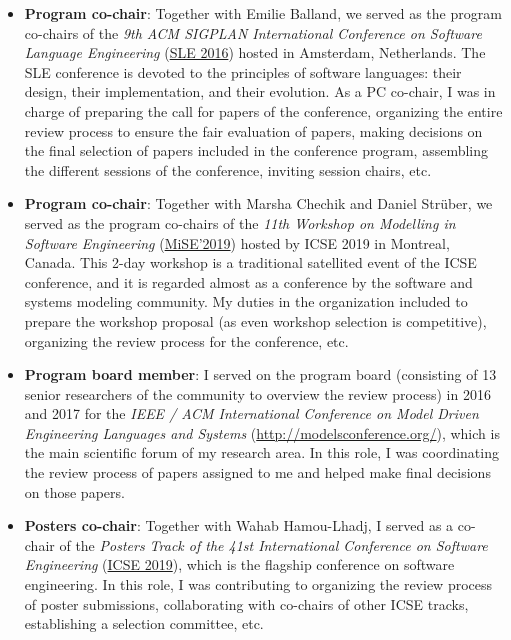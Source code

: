 \begin{itemize}
\item \textbf{Program co-chair}: Together with Emilie Balland, we served as the program co-chairs of the \emph{9th ACM SIGPLAN International Conference on Software Language Engineering} (\href{https://www.sleconf.org/2016/}{SLE 2016}) hosted in Amsterdam, Netherlands. The SLE conference is devoted to the principles of software languages: their design, their implementation, and their evolution. As a PC co-chair, I was in charge of preparing the call for papers of the conference, organizing the entire review process to ensure the fair evaluation of papers, making decisions on the final selection of papers included in the conference program, assembling the different sessions of the conference, inviting session chairs, etc. 

\item \textbf{Program co-chair}: Together with Marsha Chechik and Daniel Strüber, we served as the program co-chairs of the \emph{11th Workshop on Modelling in Software Engineering} (\href{https://sselab.de/lab2/public/wiki/MiSE/index.php}{MiSE’2019}) hosted by ICSE 2019 in Montreal, Canada. This 2-day workshop is a traditional satellited event of the ICSE conference, and it is regarded almost as a conference by the software and systems modeling community. My duties in the organization included to prepare the workshop proposal (as even workshop selection is competitive), organizing the review process for the conference, etc.

\item \textbf{Program board member}: I served on the program board (consisting of 13 senior researchers of the community to overview the review process) in 2016 and 2017 for the \emph{IEEE / ACM International Conference on Model Driven Engineering Languages and Systems} (\href{MODELS}{http://modelsconference.org/}), which is the main scientific forum of my research area. In this role, I was coordinating the review process of papers assigned to me and helped make final decisions on those papers.

\item \textbf{Posters co-chair}: Together with Wahab Hamou-Lhadj, I served as a co-chair of the \emph{Posters Track of the 41st International Conference on Software Engineering} 
(\href{https://2019.icse-conferences.org/track/icse-2019-Posters}{ICSE 2019}), which is the flagship conference on software engineering. In this role, I was contributing to organizing the review process of poster submissions, collaborating with co-chairs of other ICSE tracks, establishing a selection committee, etc.


\end{itemize}
